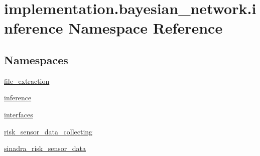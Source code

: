 \hypertarget{namespaceimplementation_1_1bayesian__network_1_1inference}{}\section{implementation.\+bayesian\+\_\+network.\+inference Namespace Reference}
\label{namespaceimplementation_1_1bayesian__network_1_1inference}
\subsection*{Namespaces}
\begin{DoxyCompactItemize}
\item 
 \hyperlink{namespaceimplementation_1_1bayesian__network_1_1inference_1_1file__extraction}{file\+\_\+extraction}
\item 
 \hyperlink{namespaceimplementation_1_1bayesian__network_1_1inference_1_1inference}{inference}
\item 
 \hyperlink{namespaceimplementation_1_1bayesian__network_1_1inference_1_1interfaces}{interfaces}
\item 
 \hyperlink{namespaceimplementation_1_1bayesian__network_1_1inference_1_1risk__sensor__data__collecting}{risk\+\_\+sensor\+\_\+data\+\_\+collecting}
\item 
 \hyperlink{namespaceimplementation_1_1bayesian__network_1_1inference_1_1sinadra__risk__sensor__data}{sinadra\+\_\+risk\+\_\+sensor\+\_\+data}
\end{DoxyCompactItemize}
